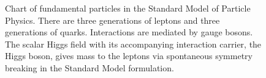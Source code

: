 \begin{figure}[ht]
\centering
{}
\caption {Chart of fundamental particles in the Standard Model of Particle Physics. There are three generations of leptons and three generations of quarks. Interactions are mediated by gauge bosons. The scalar Higgs field with its accompanying interaction carrier, the Higgs boson, gives mass to the leptons via spontaneous symmetry breaking in the Standard Model formulation.}
\label{fig:SM_particles}
\end{figure}

